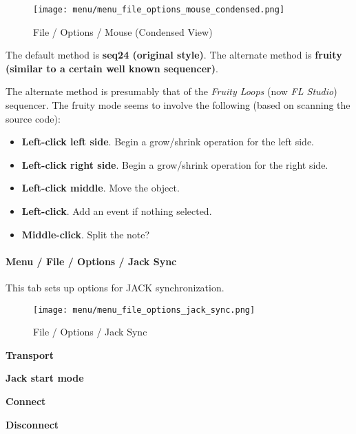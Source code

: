 \begin{figure}[H]
   \centering 
   \texttt{[image: menu/menu\_file\_options\_mouse\_condensed.png]}
   \caption{File / Options / Mouse (Condensed View)}
   \label{fig:seq24_menu_file_options_mouse}
\end{figure}

   The default method is \textbf{seq24 (original style)}.
   The alternate method is \textbf{fruity (similar to a certain well known
   sequencer)}.

   The alternate method is presumably that of the \textsl{Fruity Loops}
   (now \textsl{FL Studio}) sequencer.  The fruity mode seems to involve the
   following (based on scanning the source code):
   
   \begin{itemize}
      \item \textbf{Left-click left side}.
         Begin a grow/shrink operation for the left side.
      \item \textbf{Left-click right side}.
         Begin a grow/shrink operation for the right side.
      \item \textbf{Left-click middle}.
         Move the object.
      \item \textbf{Left-click}.
         Add an event if nothing selected.
      \item \textbf{Middle-click}.
         Split the note?
   \end{itemize}

\paragraph{Menu / File / Options / Jack Sync }
\label{paragraph:seq24_menu_file_options_jack_sync}

   This tab sets up options for JACK synchronization.

\begin{figure}[H]
   \centering 
   \texttt{[image: menu/menu\_file\_options\_jack\_sync.png]}
   \caption{File / Options / Jack Sync}
   \label{fig:seq24_menu_file_options_jack_sync}
\end{figure}

   \begin{enumber}
      \item \textbf{Transport}
      \item \textbf{Jack start mode}
      \item \textbf{Connect}
      \item \textbf{Disconnect}
   \end{enumber}


